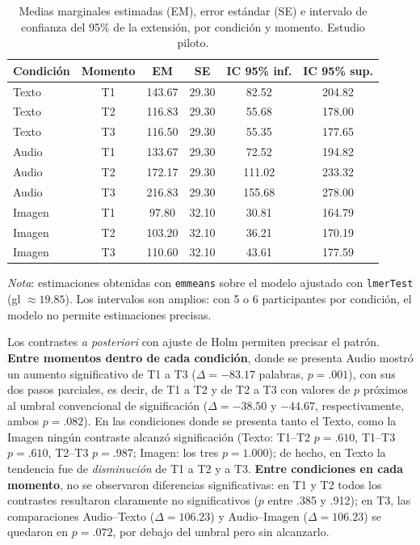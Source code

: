 \documentclass[12pt]{article}
\begin{document}
	\begin{table}[H]
		\centering
		\small
		\setlength{\tabcolsep}{4pt}
		\caption{Medias marginales estimadas (EM), error estándar (SE) e intervalo de confianza del 95\% de la extensión, por condición y momento. Estudio piloto.}
		\label{tab:emm_piloto}
		\begin{tabular}{@{}l c c c c c@{}}
			\toprule
			Condición & Momento & EM & SE & IC 95\% inf. & IC 95\% sup. \\
			\midrule
			Texto  & T1 & 143.67 & 29.30 &  82.52 & 204.82 \\
			Texto  & T2 & 116.83 & 29.30 &  55.68 & 178.00 \\
			Texto  & T3 & 116.50 & 29.30 &  55.35 & 177.65 \\
			\midrule
			Audio  & T1 & 133.67 & 29.30 &  72.52 & 194.82 \\
			Audio  & T2 & 172.17 & 29.30 & 111.02 & 233.32 \\
			Audio  & T3 & 216.83 & 29.30 & 155.68 & 278.00 \\
			\midrule
			Imagen & T1 &  97.80 & 32.10 &  30.81 & 164.79 \\
			Imagen & T2 & 103.20 & 32.10 &  36.21 & 170.19 \\
			Imagen & T3 & 110.60 & 32.10 &  43.61 & 177.59 \\
			\bottomrule
		\end{tabular}
		\par\smallskip
		\noindent\begin{minipage}{\textwidth}
			\footnotesize
			\emph{Nota}: estimaciones obtenidas con \texttt{emmeans} sobre el modelo ajustado con \texttt{lmerTest} (gl $\approx 19.85$). Los intervalos son amplios: con 5 o 6 participantes por condición, el modelo no permite estimaciones precisas.
		\end{minipage}
	\end{table}
	
	Los contrastes \emph{a posteriori} con ajuste de Holm permiten precisar el patrón. \textbf{Entre momentos dentro de cada condición}, donde se presenta Audio mostró un aumento significativo de T1 a T3 ($\Delta = -83.17$ palabras, $p = .001$), con sus dos pasos parciales, es decir, de T1 a T2 y de T2 a T3 con valores de $p$ próximos al umbral convencional de significación ($\Delta = -38.50$ y $-44.67$, respectivamente, ambos $p = .082$). En las condiciones donde se presenta tanto el Texto, como la Imagen ningún contraste alcanzó significación (Texto: T1--T2 $p = .610$, T1--T3 $p = .610$, T2--T3 $p = .987$; Imagen: los tres $p = 1.000$); de hecho, en Texto la tendencia fue de \emph{disminución} de T1 a T2 y a T3. \textbf{Entre condiciones en cada momento}, no se observaron diferencias significativas: en T1 y T2 todos los contrastes resultaron claramente no significativos ($p$ entre .385 y .912); en T3, las comparaciones Audio--Texto ($\Delta = 106.23$) y Audio--Imagen ($\Delta = 106.23$) se quedaron en $p = .072$, por debajo del umbral pero sin alcanzarlo.
	
\end{document}
